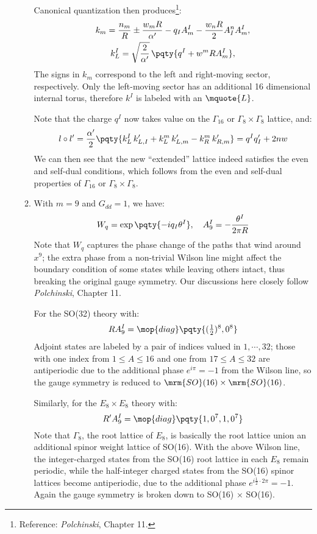 \documentclass[a4paper,10pt]{article}
\begin{document}
\begin{enumerate}
\begin{enumerate}
	Canonical quantization then produces\footnote{
		Reference: \textit{Polchinski}, Chapter 11. 
	}:
	\begin{gather}
		k_m
		= \frac{n_m}{R}
			\pm \frac{w_m R}{\alpha'}
			- q_I A^I_m
			- \frac{w_n R}{2} A^n_I A_m^I,
	\\
		k^I_L
		= \sqrt{\frac{2}{\alpha'}}\,
			\pqty{
				q^I + w^m R A^I_m
			},
	\end{gather}
	The \mquote{\pm} signs in $k_m$ correspond to the left and right-moving sector, respectively. Only the left-moving sector has an additional 16 dimensional internal torus, therefore $k^I$ is labeled with an $\mquote{L}$. 
	
	Note that the charge $q^I$ now takes value on the $\Gamma_{16}$ or $\Gamma_8\times \Gamma_8$ lattice, and:
	\begin{equation}
		l\circ l'
		= \frac{\alpha'}{2} \pqty{
				k^I_L\, k'_{L,I}
				+ k^m_L\, k'_{L,m}
				- k^m_R\, k'_{R,m}
			}
		= q^I q'_I
			+ 2nw
	\end{equation}
	We can then see that the new ``extended'' lattice indeed satisfies the even and self-dual conditions, which follows from the even and self-dual properties of $\Gamma_{16}$ or $\Gamma_8\times \Gamma_8$. 
	
	\item With $m = 9$ and $G_{dd} = 1$, we have:
	\begin{equation}
		W_q = \exp \pqty{-iq_I\theta^I},
	\quad
		A^I_9 = - \frac{\theta^I}{2\pi R}
	\end{equation}
	Note that $W_q$ captures the phase change of the paths that wind around $x^9$; the extra phase from a non-trivial Wilson line might affect the boundary condition of some states while leaving others intact, thus breaking the original gauge symmetry. Our discussions here closely follow \textit{Polchinski}, Chapter 11. 
	
	For the SO(32) theory with:
	\begin{equation}
		RA^I_9
		= \mop{diag} \pqty{
				(\tfrac{1}{2})^8,
				0^8
			}
	\end{equation}
	Adjoint states are labeled by a pair of indices valued in $1,\cdots,32$; those with one index from $1 \le A \le 16$ and one from $17 \le A \le 32$ are antiperiodic due to the additional phase $e^{i\pi} = -1$ from the Wilson line, so the gauge symmetry is reduced to $\mrm{SO}(16) \times \mrm{SO}(16)$. 
	
	Similarly, for the $E_8 \times E_8$ theory with:
	\begin{equation}
		R' A^I_9
		= \mop{diag} \pqty{
				1,0^7,
				1,0^7
			}
	\end{equation}
	Note that $\Gamma_8$, the root lattice of $E_8$, is basically the root lattice union an additional spinor weight lattice of SO(16). With the above Wilson line, the integer-charged states from the SO(16) root lattice in each $E_8$ remain periodic, while the half-integer charged states from the SO(16) spinor lattices become antiperiodic, due to the additional phase $e^{i\frac{1}{2}\cdot 2\pi} = -1$. Again the gauge symmetry is broken down to SO(16) × SO(16). 
	

\end{enumerate}
\end{enumerate}
\end{document}
